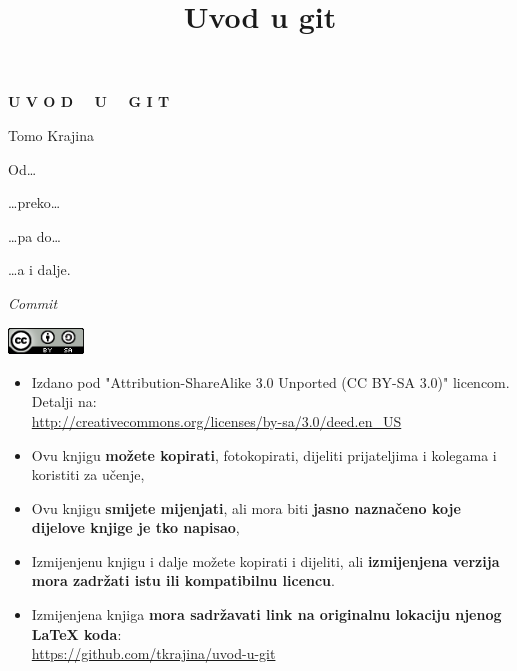 \documentclass[11pt,twoside,a4paper]{report}
\title{Uvod u git}
\begin{document}
\begin{titlepage}
	\vspace*{1cm}

	\begin{center}
		\Huge \textbf{U V O D \ \ U \ \ G I T}
	\end{center}
	\begin{center}
        Tomo Krajina
	\end{center}

	\vspace*{0.5cm}

	Od\dots

	

	\dots{}preko\dots

	

	\dots{}pa do\dots

	

	\dots{}a i dalje.

	\vspace*{1cm}

	\begin{center}
		\emph{Commit}
		
	\end{center}

\end{titlepage}

\pagestyle{empty}

\vspace*{4cm}

\begin{center}
    \includegraphics[width=2cm]{images/cc-88x31.png}
\end{center}

\begin{itemize}
    \item Izdano pod "Attribution-ShareAlike 3.0 Unported (CC BY-SA 3.0)" licencom. Detalji na: \\ \url{http://creativecommons.org/licenses/by-sa/3.0/deed.en_US}
    \item Ovu knjigu \textbf{možete kopirati}, fotokopirati, dijeliti prijateljima i kolegama i koristiti za učenje,
    \item Ovu knjigu \textbf{smijete mijenjati}, ali mora biti \textbf{jasno naznačeno koje dijelove knjige je tko napisao},
    \item Izmijenjenu knjigu i dalje možete kopirati i dijeliti, ali \textbf{izmijenjena verzija mora zadržati istu ili kompatibilnu licencu}.
    \item Izmijenjena knjiga \textbf{mora sadržavati link na originalnu lokaciju njenog \LaTeX{} koda}: \\ \url{https://github.com/tkrajina/uvod-u-git}
\end{itemize}
\end{document}
